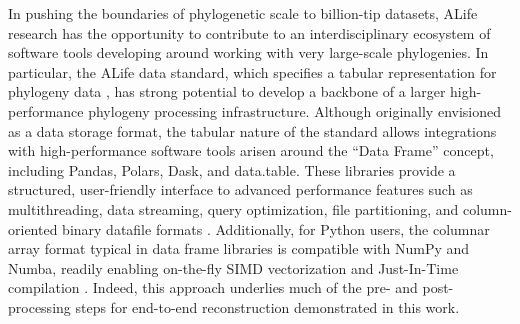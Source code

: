 In pushing the boundaries of phylogenetic scale to billion-tip datasets, ALife research has the opportunity to contribute to an interdisciplinary ecosystem of software tools developing around working with very large-scale phylogenies.
In particular, the ALife data standard, which specifies a tabular representation for phylogeny data \citep{lalejini2019data}, has strong potential to develop a backbone of a larger high-performance phylogeny processing infrastructure.
Although originally envisioned as a data storage format, the tabular nature of the standard allows integrations with high-performance software tools arisen around the ``Data Frame'' concept, including Pandas, Polars, Dask, and data.table.
These libraries provide a structured, user-friendly interface to advanced performance features such as multithreading, data streaming, query optimization, file partitioning, and column-oriented binary datafile formats \citep{mckinney2010data,datatable,vink2024polars,rocklin2015dask}.
Additionally, for Python users, the columnar array format typical in data frame libraries is compatible with NumPy and Numba, readily enabling on-the-fly SIMD vectorization and Just-In-Time compilation \citep{harris2020array,lam2015numba}.
Indeed, this approach underlies much of the pre- and post-processing steps for end-to-end reconstruction demonstrated in this work.
